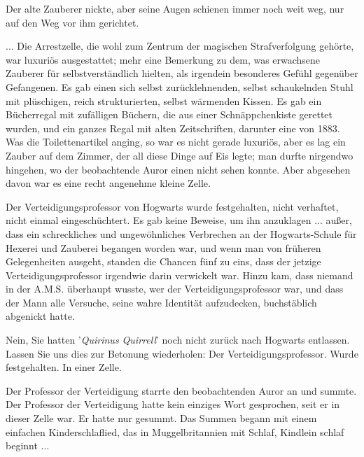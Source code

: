 Der alte Zauberer nickte, aber seine Augen schienen immer noch weit weg, nur auf
den Weg vor ihm gerichtet.

... Die Arrestzelle, die wohl zum Zentrum der magischen Strafverfolgung gehörte,
war luxuriös ausgestattet; mehr eine Bemerkung zu dem, was erwachsene Zauberer
für selbstverständlich hielten, als irgendein besonderes Gefühl gegenüber
Gefangenen. Es gab einen sich selbst zurücklehnenden, selbst schaukelnden Stuhl
mit plüschigen, reich strukturierten, selbst wärmenden Kissen. Es gab ein
Bücherregal mit zufälligen Büchern, die aus einer Schnäppchenkiste gerettet
wurden, und ein ganzes Regal mit alten Zeitschriften, darunter eine von 1883.
Was die Toilettenartikel anging, so war es nicht gerade luxuriös, aber es lag
ein Zauber auf dem Zimmer, der all diese Dinge auf Eis legte; man durfte
nirgendwo hingehen, wo der beobachtende Auror einen nicht sehen konnte. Aber
abgesehen davon war es eine recht angenehme kleine Zelle.

Der Verteidigungsprofessor von Hogwarts wurde festgehalten, nicht verhaftet,
nicht einmal eingeschüchtert. Es gab keine Beweise, um ihn anzuklagen ... außer,
dass ein schreckliches und ungewöhnliches Verbrechen an der Hogwarts-Schule für
Hexerei und Zauberei begangen worden war, und wenn man von früheren
Gelegenheiten ausgeht, standen die Chancen fünf zu eins, dass der jetzige
Verteidigungsprofessor irgendwie darin verwickelt war. Hinzu kam, dass niemand
in der A.M.S. überhaupt wusste, wer der Verteidigungsprofessor war, und dass der
Mann alle Versuche, seine wahre Identität aufzudecken, buchstäblich abgenickt
hatte.

Nein, Sie hatten '\emph{Quirinus Quirrell}' noch nicht zurück nach Hogwarts
entlassen. Lassen Sie uns dies zur Betonung wiederholen: Der
Verteidigungsprofessor. Wurde festgehalten. In einer Zelle.

Der Professor der Verteidigung starrte den beobachtenden Auror an und summte.
Der Professor der Verteidigung hatte kein einziges Wort gesprochen, seit er in
dieser Zelle war. Er hatte nur gesummt. Das Summen begann mit einem einfachen
Kinderschlaflied, das in Muggelbritannien mit \glqq{}Schlaf, Kindlein
schlaf\grqq{} beginnt ...

